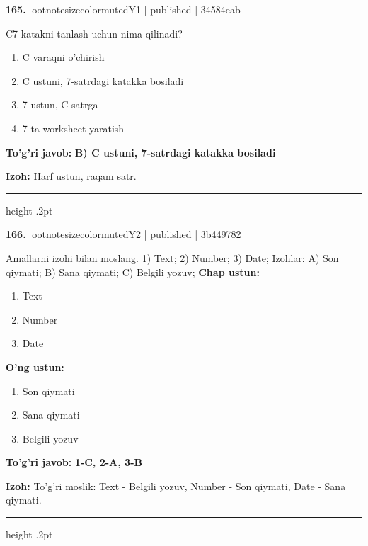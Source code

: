 \documentclass[10pt,a4paper]{article}
\begin{document}
\textbf{\color{ink}165.} {ootnotesizecolor{muted}Y1 | published | 34584eab}
\par
C7 katakni tanlash uchun nima qilinadi?
\begin{enumerate}[label=\Alph*),leftmargin=9mm]
\item C varaqni o'chirish
\item C ustuni, 7-satrdagi katakka bosiladi
\item 7-ustun, C-satrga
\item 7 ta worksheet yaratish
\end{enumerate}
\begin{tcolorbox}[enhanced,breakable,colback=teal!4,colframe=teal!55!black,boxrule=0.45pt,arc=1.2mm,left=2.8mm,right=2.8mm,top=2mm,bottom=2mm]
\textbf{\color{teal}To'g'ri javob:} \textbf{B) C ustuni, 7-satrdagi katakka bosiladi}
\par\smallskip
\textbf{Izoh:} Harf ustun, raqam satr.
\end{tcolorbox}
\vspace{2mm}\hrule height .2pt\vspace{2mm}

\textbf{\color{ink}166.} {ootnotesizecolor{muted}Y2 | published | 3b449782}
\par
Amallarni izohi bilan moslang.  1) Text;  2) Number;  3) Date;  Izohlar: A) Son qiymati;  B) Sana qiymati;  C) Belgili yozuv;
\textbf{Chap ustun:}\begin{enumerate}[label=\arabic*),leftmargin=9mm]
\item Text
\item Number
\item Date
\end{enumerate}
\textbf{O'ng ustun:}\begin{enumerate}[label=\Alph*),leftmargin=9mm]
\item Son qiymati
\item Sana qiymati
\item Belgili yozuv
\end{enumerate}
\begin{tcolorbox}[enhanced,breakable,colback=teal!4,colframe=teal!55!black,boxrule=0.45pt,arc=1.2mm,left=2.8mm,right=2.8mm,top=2mm,bottom=2mm]
\textbf{\color{teal}To'g'ri javob:} \textbf{1-C, 2-A, 3-B}
\par\smallskip
\textbf{Izoh:} To'g'ri moslik: Text - Belgili yozuv, Number - Son qiymati, Date - Sana qiymati.
\end{tcolorbox}
\vspace{2mm}\hrule height .2pt\vspace{2mm}
\end{document}
